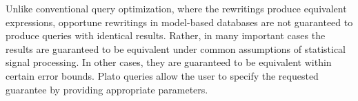 Unlike conventional query optimization, where the rewritings produce equivalent expressions, opportune rewritings in model-based databases are not guaranteed to produce queries with identical results. Rather, in many important cases the results are guaranteed to be equivalent under common assumptions of statistical signal processing. In other cases, they are guaranteed to be equivalent within certain error bounds. Plato queries allow the user to specify the requested guarantee by providing appropriate parameters.



